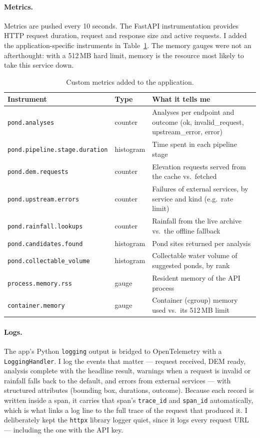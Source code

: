 \documentclass[11pt]{article}
\begin{document}
\paragraph{Metrics.}
Metrics are pushed every 10 seconds. The FastAPI instrumentation provides HTTP
request duration, request and response size and active requests. I added the
application-specific instruments in Table~\ref{tab:metrics}. The memory gauges were
not an afterthought: with a 512\,MB hard limit, memory is the resource most likely
to take this service down.

\begin{table}[htbp]
\centering
\small
\begin{tabularx}{\linewidth}{@{}llX@{}}
\toprule
Instrument & Type & What it tells me \\
\midrule
\texttt{pond.analyses} & counter & Analyses per endpoint and outcome (ok, invalid\_request, upstream\_error, error) \\
\texttt{pond.pipeline.stage.duration} & histogram & Time spent in each pipeline stage \\
\texttt{pond.dem.requests} & counter & Elevation requests served from the cache vs.\ fetched \\
\texttt{pond.upstream.errors} & counter & Failures of external services, by service and kind (e.g.\ rate limit) \\
\texttt{pond.rainfall.lookups} & counter & Rainfall from the live archive vs.\ the offline fallback \\
\texttt{pond.candidates.found} & histogram & Pond sites returned per analysis \\
\texttt{pond.collectable\_volume} & histogram & Collectable water volume of suggested ponds, by rank \\
\texttt{process.memory.rss} & gauge & Resident memory of the API process \\
\texttt{container.memory} & gauge & Container (cgroup) memory used vs.\ its 512\,MB limit \\
\bottomrule
\end{tabularx}
\caption{Custom metrics added to the application.}
\label{tab:metrics}
\end{table}

\paragraph{Logs.}
The app's Python \texttt{logging} output is bridged to OpenTelemetry with a
\texttt{LoggingHandler}. I log the events that matter --- request received, DEM
ready, analysis complete with the headline result, warnings when a request is
invalid or rainfall falls back to the default, and errors from external services ---
with structured attributes (bounding box, durations, outcome). Because each record
is written inside a span, it carries that span's \texttt{trace\_id} and
\texttt{span\_id} automatically, which is what links a log line to the full trace of
the request that produced it. I deliberately kept the \texttt{httpx} library logger
quiet, since it logs every request URL --- including the one with the API key.
\end{document}

